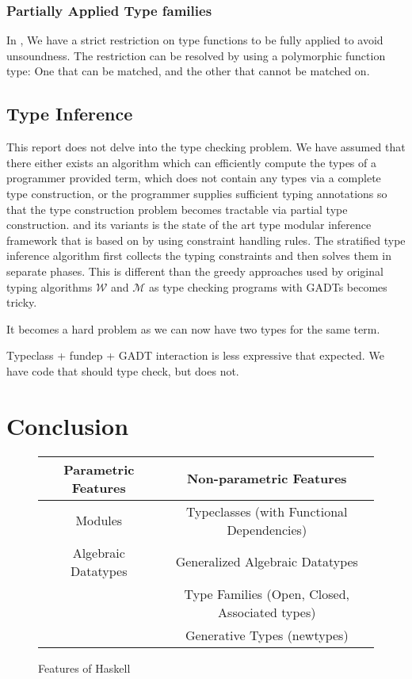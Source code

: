 \documentclass[manuscript,screen,nonacm]{acmart}
\begin{document}
\subsubsection{Partially Applied Type families}
In \SFC, We have a strict restriction on type functions to be fully applied to avoid unsoundness. The restriction can be resolved by using a polymorphic function type\cite{kiss_higher-order_2019}: One that can be matched, and the other that cannot be matched on.

\subsection{Type Inference}
This report does not delve into the type checking problem. We have assumed that there either exists an algorithm which can efficiently compute the types of a programmer provided term, which does not contain any types via a complete type construction\cite{milner_theory_1978}, or the programmer supplies sufficient typing annotations so that the type construction problem becomes tractable via partial type construction\cite{pierce_local_2000, dunfield_bidirectional_2021}. \HMX and its variants is the state of the art type modular inference framework that is based on by using constraint handling rules. The stratified type inference algorithm\cite{pottier_stratified_2006} first collects the typing constraints and then solves them in separate phases. This is different than the greedy approaches used by original typing algorithms\cite{lee_proofs_1998} $\mathcal{W}$ and $\mathcal{M}$ as type checking programs with GADTs becomes tricky.

It becomes a hard problem as we can now have two types for the same term. \cite{peyton_jones_wobbly_2004, jones_practical_2007, pottier_stratified_2006, vytiniotis_outsideinx_2011}

Typeclass + fundep + GADT interaction is less expressive that expected. We have code that should type check, but does not.


\section{Conclusion}\label{sec:conclusion}

\begin{figure}[ht]
 \centering
 \begin{tabular}[ht]{c | c}
 Parametric Features & Non-parametric Features \\
 \hline
 Modules & Typeclasses (with Functional Dependencies)\\
 Algebraic Datatypes & Generalized Algebraic Datatypes\\
 & Type Families (Open, Closed, Associated types)\\
 & Generative Types (newtypes)
 \end{tabular}
 \caption{Features of Haskell}
 \label{fig:haskell-lang-features}
\end{figure}
\end{document}
